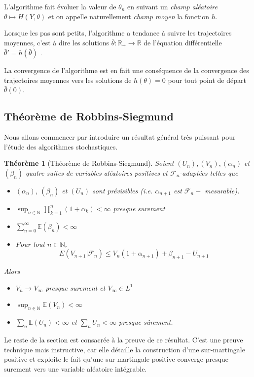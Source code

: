 \documentclass[a4paper,12pt]{book}
\newtheorem{thmfr}{Théorème}[section]
\newcommand{\E}{\mathbb{E}}
\newcommand{\N}{\mathbb{N}}
\begin{document}
L'algorithme fait évoluer la valeur de $\theta_n$ en suivant un \emph{champ aléatoire} $\theta\mapsto H(Y,\theta)$ et on appelle naturellement \emph{champ moyen} la fonction $h$.

Lorsque les pas sont petits, l'algorithme a tendance à suivre les trajectoires moyennes, c'est à dire les solutions $\bar{\theta}:\mathbb{R}_+\to \mathbb{R}$ de l'équation différentielle $\bar{\theta}'=h(\bar{\theta})$ .

La convergence de l'algorithme est en fait une conséquence de la convergence des trajectoires moyennes vers les solutions de $h(\theta)=0$ pour tout point de départ $\bar{\theta}(0)$.


\subsection{Théorème de Robbins-Siegmund}
Nous allons commencer par introduire un résultat général très puissant pour l'étude des algorithmes stochastiques.

\begin{thmfr}[Théorème de Robbins-Siegmund]
Soient $(U_n), (V_n), (\alpha_n)$ et $(\beta_n)$ quatre suites de variables aléatoires positives et $\mathcal{F}_n$-adaptées telles que
\begin{itemize}
\item[(1)] $(\alpha_n)$,  $(\beta_n)$ et $(U_n)$ sont prévisibles (i.e. $\alpha_{n+1}$ est $\mathcal{F}_n-$ mesurable).
\item[(2)] $\sup_{n\in\N} \prod_{k=1}^n (1+\alpha_k) <\infty $ presque surement
\item[(3)] $\sum_{n=0}^{\infty} \E(\beta_n)<\infty$
\item[(4)] Pour tout $n\in \N$,
\begin{equation}
\label{eq:ineg_rec}E(V_{n+1}\lvert\mathcal{F}_n) \le V_n(1+\alpha_{n+1})+\beta_{n+1}-U_{n+1}
\end{equation}
\end{itemize}
Alors
\begin{itemize}
\item[a)]$V_n\longrightarrow V_\infty$ presque surement et $V_\infty\in L^1$
\item[b)]$\sup_{n\in\N} \E(V_n)<\infty$
\item[c)]$\sum_{n}\E(U_n)<\infty$ et $\sum_{n}U_n<\infty $ presque sûrement.
\end{itemize}
\end{thmfr}

Le reste de la section est consacrée à la preuve de ce résultat. C'est une preuve technique mais instructive, car elle détaille la construction d'une sur-martingale positive et exploite le fait qu'une sur-martingale positive converge presque surement vers une variable aléatoire intégrable.
\end{document}
